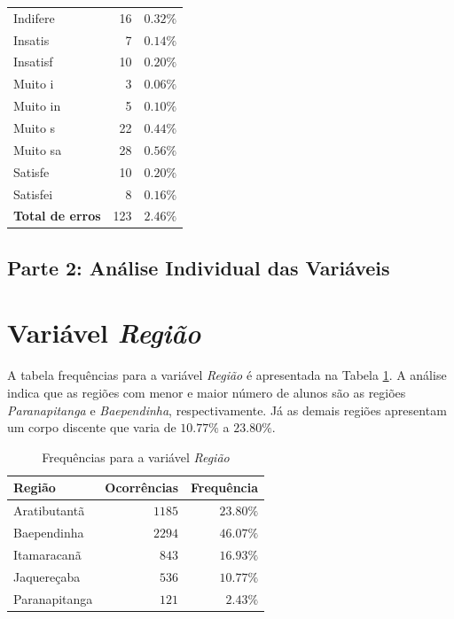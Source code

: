 \documentclass[10pt,a4paper,oneside]{article}
\newcommand{\arat}{Aratibutantã\xspace}
\newcommand{\baep}{Baependinha\xspace}
\newcommand{\itam}{Itamaracanã\xspace}
\newcommand{\jaqu}{Jaquereçaba\xspace}
\newcommand{\para}{Paranapitanga\xspace}
\begin{document}
\begin{table}[!h]
\begin{minipage}[t]{0.49\textwidth}
\begin{tabular}{l r r}
	Indifere   & 16  & $0.32\%$ \\
	Insatis    & 7   & $0.14\%$ \\
	Insatisf   & 10  & $0.20\%$ \\
	Muito i    & 3   & $0.06\%$ \\
	Muito in   & 5   & $0.10\%$ \\
	Muito s    & 22  & $0.44\%$ \\
	Muito sa   & 28  & $0.56\%$ \\
	Satisfe    & 10  & $0.20\%$ \\
	Satisfei   & 8   & $0.16\%$ \\	
	\midrule
	\textbf{Total de erros}  & 123  & $2.46\%$ \\	
	\bottomrule
\end{tabular}
\end{minipage}
\end{table}


\begin{table}[!h]
\centering

\end{table}

\FloatBarrier
\clearpage
\begin{center}
\section*{Parte 2: Análise Individual das Variáveis}
\end{center}

\section{Variável \textit{Região}}
\label{section:regiao}

A tabela frequências para a variável \textit{Região} é apresentada na Tabela \ref{table: frequencias regiao}. A análise indica que as regiões com menor e maior número de alunos são as regiões \textit{\para} e \textit{\baep}, respectivamente. Já as demais regiões apresentam um corpo discente que varia de $10.77\%$ a $23.80\%$.

\begin{table}[h]
\small
\centering
\caption{Frequências para a variável \textit{Região}}
\label{table: frequencias regiao}
\vspace{0.5em}
\begin{tabular}{l r r}
	\toprule
	\textbf{Região} & \textbf{Ocorrências} & \textbf{Frequência} \\
	\midrule
	\arat           & $1185$               & $23.80\%$           \\
	\baep           & $2294$               & $46.07\%$           \\
	\itam           & $843$                & $16.93\%$           \\
	\jaqu           & $536$                & $10.77\%$           \\
	\para           & $121$                & $2.43\%$            \\
	\bottomrule
\end{tabular}
\end{table}
\end{document}
